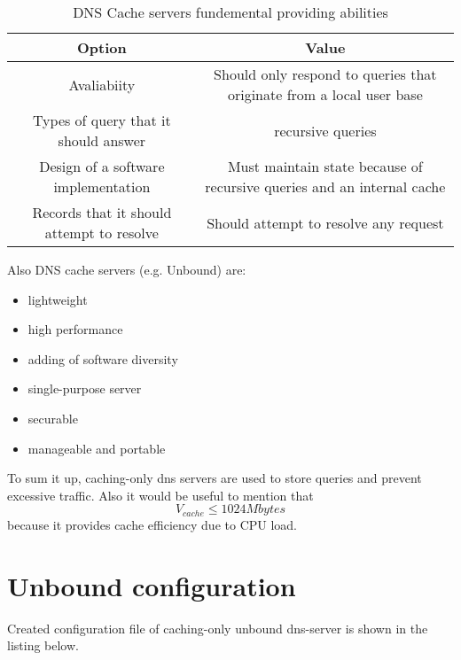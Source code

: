 \documentclass[a4paper]{article}
\newcommand\tab[1][1cm]{\hspace*{#1}}
\begin{document}
\begin{table}[h!]
\begin{center}
  \begin{tabular}{ c | c }
    \textbf{Option} & \textbf{Value}\\
    \hline
	Avaliabiity & Should only respond to queries that originate from a local user base \\ \hline
	Types of query that it should answer & recursive queries \\ \hline
	Design of a software implementation & Must maintain state because of recursive queries and an internal cache\\ \hline
	Records that it should attempt to resolve & Should attempt to resolve any request \\ \hline
	\end{tabular}
\end{center}
\caption{DNS Cache servers fundemental providing abilities}
\label{table:dns_cache_opt}
\end{table}
	
\tab Also DNS cache servers (e.g. Unbound) are:
\begin{itemize}
	\item lightweight
	\item high performance
	\item adding of software diversity
	\item single-purpose server
	\item securable
	\item manageable and portable
\end{itemize}

To sum it up, caching-only dns servers are used to store queries and prevent excessive traffic. Also it would be useful to mention that \begin{equation} V_{cache} \leq 1024 Mbytes \end{equation} because it provides cache efficiency due to CPU load.
 
\section{Unbound configuration}
\tab Created configuration file of caching-only unbound dns-server is shown in the listing below.
\end{document}
